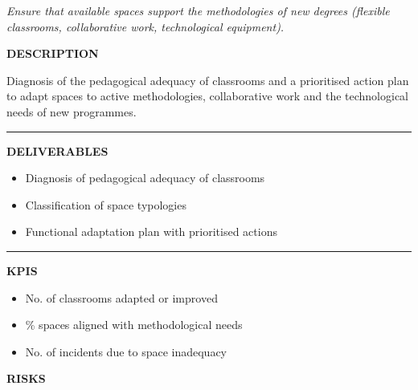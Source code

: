 \documentclass[11pt,a4paper]{scrreprt}
\newcommand{\fieldlabel}[1]{%
  {\footnotesize\sffamily\bfseries\color{mutedcolor}\MakeUppercase{#1}}\par\nopagebreak[4]
}
\newcommand{\fieldsep}{\vspace{3pt}\noindent\textcolor{bordercolor}{\rule{\linewidth}{0.4pt}}\vspace{3pt}\par}
\begin{document}
\newpage
{}
{\small\color{mutedcolor}\itshape Ensure that available spaces support the methodologies of new degrees (flexible classrooms, collaborative work, technological equipment).}\par\vspace{6pt}

\begin{tcolorbox}[pabox={espcolor}{A.P.6.1 \enspace\textbullet\enspace Functional Adaptation of Teaching Spaces}]

\fieldlabel{Description}
{\small Diagnosis of the pedagogical adequacy of classrooms and a prioritised action plan to adapt spaces to active methodologies, collaborative work and the technological needs of new programmes.}\par
\fieldsep
\fieldlabel{Deliverables}
{\small \begin{itemize}[noitemsep,topsep=2pt]
\item Diagnosis of pedagogical adequacy of classrooms
\item Classification of space typologies
\item Functional adaptation plan with prioritised actions
\end{itemize}}\par
\fieldsep
\fieldlabel{KPIs}
{\small \begin{itemize}[noitemsep,topsep=2pt]
\item No. of classrooms adapted or improved
\item \% spaces aligned with methodological needs
\item No. of incidents due to space inadequacy
\end{itemize}}\par
\end{tcolorbox}
\begin{tcolorbox}[riskbox]
{\footnotesize\sffamily\bfseries\color{red!50!black} RISKS}\par{}
\end{tcolorbox}
\end{document}
